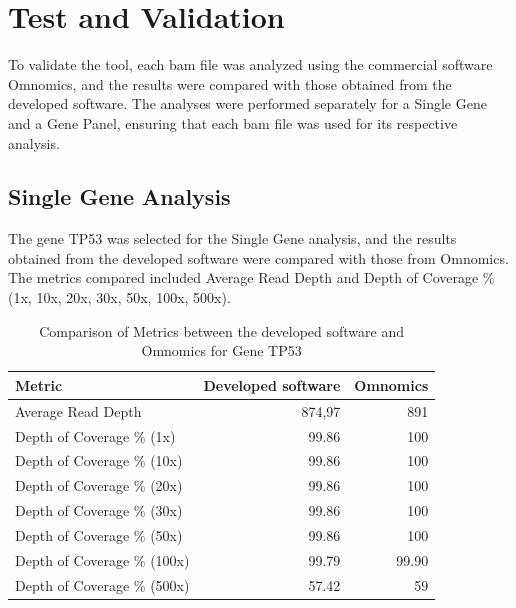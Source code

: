 \section{Test and Validation}

To validate the tool, each \ac{bam} file was analyzed using the commercial software Omnomics, and the results were compared with those obtained from the developed software. The analyses were performed separately for a Single Gene and a Gene Panel, ensuring that each \ac{bam} file was used for its respective analysis.

\subsection{Single Gene Analysis}

The gene TP53 was selected for the Single Gene analysis, and the results obtained from the developed software were compared with those from Omnomics. The metrics compared included Average Read Depth and Depth of Coverage \% (1x, 10x, 20x, 30x, 50x, 100x, 500x).

\begin{table}[H]
    \centering
    \caption{Comparison of Metrics between the developed software and Omnomics for Gene TP53}
    \label{tab:omnomicsVSunilabs}
    \begin{tabular}{@{}lrr@{}}
    \toprule
    \textbf{Metric}             & \textbf{Developed software} & \textbf{Omnomics} \\ \midrule
    Average Read Depth          & 874,97                      & 891               \\
    Depth of Coverage \% (1x)   & 99.86                       & 100               \\
    Depth of Coverage \% (10x)  & 99.86                       & 100               \\
    Depth of Coverage \% (20x)  & 99.86                       & 100               \\
    Depth of Coverage \% (30x)  & 99.86                       & 100               \\
    Depth of Coverage \% (50x)  & 99.86                       & 100               \\
    Depth of Coverage \% (100x) & 99.79                       & 99.90             \\
    Depth of Coverage \% (500x) & 57.42                       & 59                \\ \bottomrule
    \end{tabular}
    \end{table}

